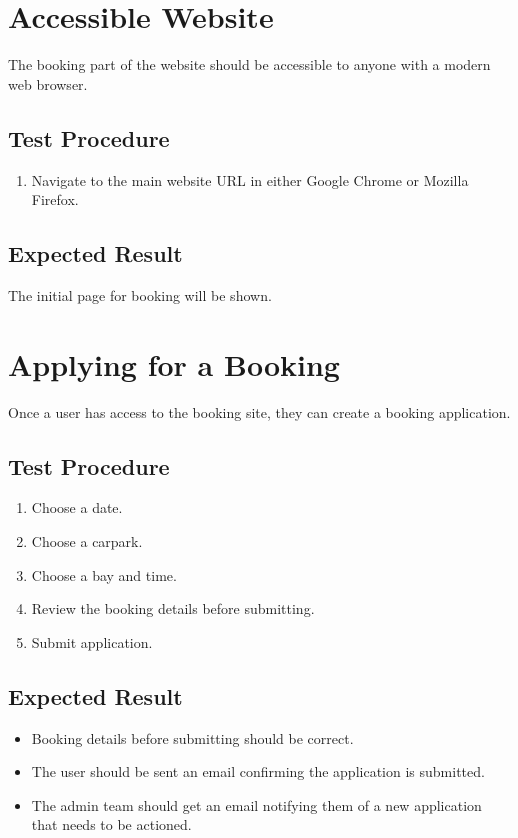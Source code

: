 \documentclass[a4paper, draft]{article}
\begin{document}
\newpage
\section{Accessible Website}
The booking part of the website should be accessible to anyone with a modern web browser.

\subsection{Test Procedure}
\begin{enumerate}
    \item Navigate to the main website URL in either Google Chrome or Mozilla Firefox.
\end{enumerate}

\subsection{Expected Result}
The initial page for booking will be shown.

\section{Applying for a Booking}
Once a user has access to the booking site, they can create a booking application.

\subsection{Test Procedure}
\begin{enumerate}
    \item Choose a date.
    \item Choose a carpark.
    \item Choose a bay and time.
    \item Review the booking details before submitting.
    \item Submit application.
\end{enumerate}

\subsection{Expected Result}
\begin{itemize}
    \item Booking details before submitting should be correct.
    \item The user should be sent an email confirming the application is submitted.
    \item The admin team should get an email notifying them of a new application that needs to be actioned.
\end{itemize}
\end{document}
